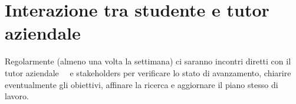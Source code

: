 \section*{Interazione tra studente e tutor aziendale}

Regolarmente (almeno una volta la settimana) ci saranno incontri diretti con il tutor aziendale \nomeTutorAziendale\ \cognomeTutorAziendale\ e stakeholders per verificare lo stato di avanzamento, chiarire eventualmente gli obiettivi, affinare la ricerca e aggiornare il piano stesso di lavoro.